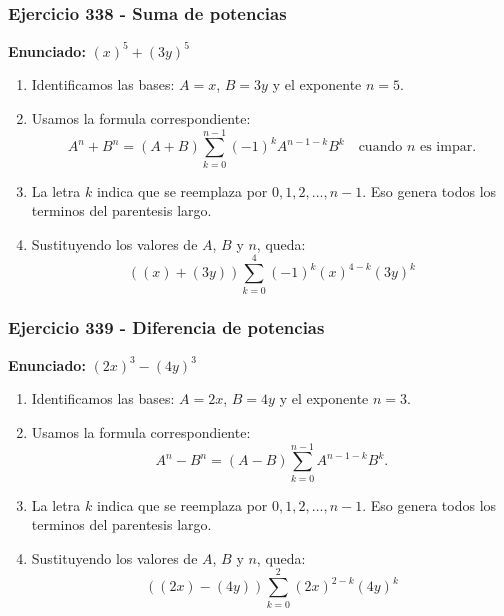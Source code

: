 \documentclass[11pt,a4paper]{article}
\begin{document}
\subsubsection*{Ejercicio 338 - Suma de potencias}
\textbf{Enunciado:} $ \left(x\right)^{5}+\left(3 y\right)^{5} $\par
\begin{enumerate}[leftmargin=2em]
\item Identificamos las bases: \(A=x\), \(B=3 y\) y el exponente \(n=5\).
\item Usamos la formula correspondiente: \[A^n+B^n=(A+B)\sum_{k=0}^{n-1}(-1)^kA^{n-1-k}B^k\quad\text{cuando }n\text{ es impar}.\]
\item La letra \(k\) indica que se reemplaza por \(0,1,2,\ldots,n-1\). Eso genera todos los terminos del parentesis largo.
\item Sustituyendo los valores de \(A\), \(B\) y \(n\), queda: \[\boxed{\left(\left(x\right)+\left(3 y\right)\right)\sum_{k=0}^{4}(-1)^k\left(x\right)^{4-k}\left(3 y\right)^k}\]
\end{enumerate}

\vspace{0.2cm}
\subsubsection*{Ejercicio 339 - Diferencia de potencias}
\textbf{Enunciado:} $ \left(2 x\right)^{3}-\left(4 y\right)^{3} $\par
\begin{enumerate}[leftmargin=2em]
\item Identificamos las bases: \(A=2 x\), \(B=4 y\) y el exponente \(n=3\).
\item Usamos la formula correspondiente: \[A^n-B^n=(A-B)\sum_{k=0}^{n-1}A^{n-1-k}B^k.\]
\item La letra \(k\) indica que se reemplaza por \(0,1,2,\ldots,n-1\). Eso genera todos los terminos del parentesis largo.
\item Sustituyendo los valores de \(A\), \(B\) y \(n\), queda: \[\boxed{\left(\left(2 x\right)-\left(4 y\right)\right)\sum_{k=0}^{2}\left(2 x\right)^{2-k}\left(4 y\right)^k}\]
\end{enumerate}

\vspace{0.2cm}
\end{document}

